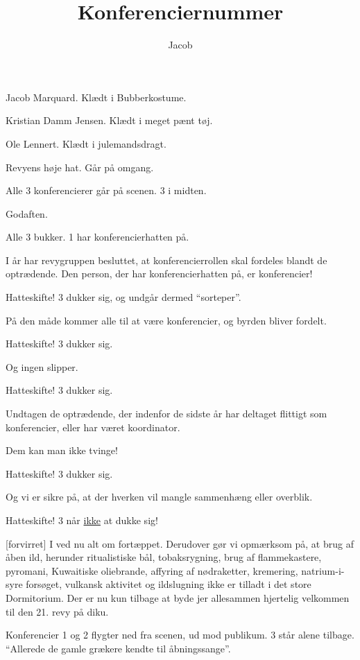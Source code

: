 \documentclass[a4paper,11pt]{article}
\title{Konferenciernummer}
\author{Jacob}
\begin{document}
\maketitle

\begin{roles}

 Jacob Marquard. Klædt i Bubberkostume.

 Kristian Damm Jensen. Klædt i meget pænt tøj.

 Ole Lennert. Klædt i julemandsdragt.

 Revyens høje hat. Går på omgang.

\end{roles}

\scene Alle 3 konferencierer går på scenen. 3 i midten.

\begin{sketch}

 Godaften.

\scene Alle 3 bukker. 1 har konferencierhatten på.

 I år har revygruppen besluttet, at konferencierrollen skal
fordeles blandt de optrædende. Den person, der har konferencierhatten
på, er konferencier!

\scene Hatteskifte! 3 dukker sig, og undgår dermed ``sorteper''.

 På den måde kommer alle til at være konferencier, og
byrden bliver fordelt.

\scene Hatteskifte! 3 dukker sig.

 Og ingen slipper.

\scene Hatteskifte! 3 dukker sig.

 Undtagen de optrædende, der indenfor de sidste år har
deltaget flittigt som konferencier, eller har været koordinator. 

 Dem kan man ikke tvinge!

\scene Hatteskifte! 3 dukker sig.

 Og vi er sikre på, at der hverken vil mangle sammenhæng
eller overblik.

\scene Hatteskifte! 3 når {\underline {ikke}} at dukke sig!

[forvirret] I ved nu alt om fortæppet. Derudover gør vi
opmærksom på, at brug af åben ild, herunder ritualistiske bål,
tobaksrygning, brug af flammekastere, pyromani, Kuwaitiske oliebrande,
affyring af nødraketter, kremering, natrium-i-syre forsøget,
vulkansk aktivitet og ildslugning ikke er tilladt i det store
Dormitorium. Der er nu kun tilbage at byde jer allesammen hjertelig
velkommen til den 21. revy på {\sc diku}.

\scene Konferencier 1 og 2 flygter ned fra scenen, ud mod publikum. 3
står alene tilbage. ``Allerede de gamle grækere kendte til
åbningssange''. 

\end{sketch}
\end{document}
